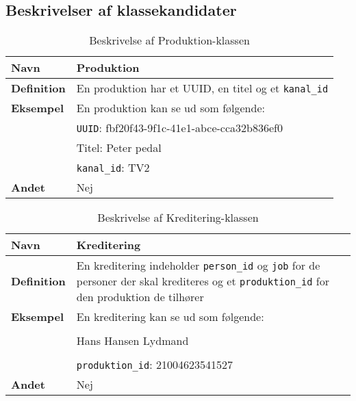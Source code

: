 \subsection{Beskrivelser af klassekandidater}


\begin{table}[H]
    \begin{tabularx}{\textwidth}{|p{3cm}|X|}
        \hline
        \textbf{Navn} & Produktion\\
        \hline
        \textbf{Definition} &  En produktion har et UUID, en titel og et \texttt{kanal\_id}\\
        \hline
        \textbf{Eksempel} & En produktion kan se ud som følgende:\\
                          & \texttt{UUID}: fbf20f43-9f1c-41e1-abce-cca32b836ef0 \\
                          & Titel: Peter pedal \\
                          & \texttt{kanal\_id}: TV2 \\
        \hline
        \textbf{Andet} & Nej\\
        \hline
    \end{tabularx}
    \caption{Beskrivelse af Produktion-klassen}
    \label{tab:production_class_description}
\end{table}

\begin{table}[H]
    \begin{tabularx}{\textwidth}{|p{3cm}|X|}
        \hline
        \textbf{Navn} & Kreditering\\
        \hline
        \textbf{Definition} & En kreditering indeholder \texttt{person\_id} og \texttt{job} for de personer der skal krediteres og et \texttt{produktion\_id} for den produktion de tilhører \\
        \hline
        \textbf{Eksempel} & En kreditering kan se ud som følgende: \\
                          & \\
                          & Hans Hansen \quad \quad \quad \quad Lydmand\\
                          & \\
                          & \texttt{produktion\_id}: 21004623541527 \\
        \hline
        \textbf{Andet} & Nej\\
        \hline
    \end{tabularx}
    \caption{Beskrivelse af Kreditering-klassen}
    \label{tab:credit_class_description}
\end{table}

